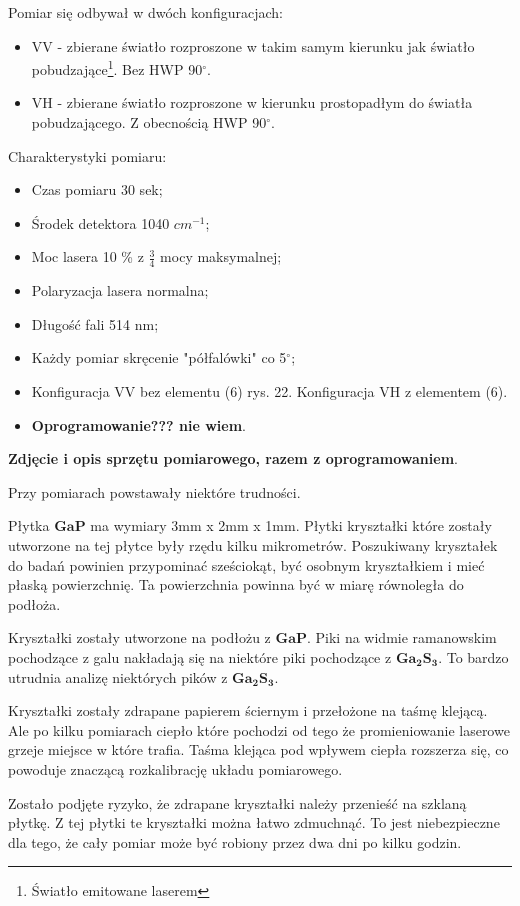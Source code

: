 Pomiar się odbywał w dwóch konfiguracjach:
\begin{itemize}
	\item VV - zbierane światło rozproszone w takim samym kierunku jak światło pobudzające\footnote{Światło emitowane laserem}. Bez HWP 90$^{\circ}$.
	\item VH - zbierane światło rozproszone w kierunku prostopadłym do światła pobudzającego. Z obecnością HWP 90$^{\circ}$.
\end{itemize} 

Charakterystyki pomiaru:
\begin{itemize}
	\item Czas pomiaru 30 sek;
	\item Środek detektora 1040 $cm^{-1}$;
	\item Moc lasera 10 \% z $\frac{3}{4}$ mocy maksymalnej;
	\item Polaryzacja lasera normalna;
	\item Długość fali 514 nm;
	\item Każdy pomiar skręcenie "półfalówki" co 5$^{\circ}$;
	\item Konfiguracja VV bez elementu (6) rys. 22. Konfiguracja VH z elementem (6).
	\item \textbf{Oprogramowanie??? nie wiem}.
\end{itemize}

\textbf{Zdjęcie i opis sprzętu pomiarowego, razem z oprogramowaniem}.

Przy pomiarach powstawały niektóre trudności.

Płytka $\mathbf{GaP}$ ma wymiary 3mm x 2mm x 1mm. Płytki kryształki które zostały utworzone na tej płytce były rzędu kilku mikrometrów. Poszukiwany kryształek do badań powinien przypominać sześciokąt, być osobnym kryształkiem i mieć płaską powierzchnię. Ta powierzchnia powinna być w miarę równoległa do podłoża.

Kryształki zostały utworzone na podłożu z $\mathbf{GaP}$. Piki na widmie ramanowskim pochodzące z galu nakładają się na niektóre piki pochodzące z $\mathbf{Ga_{2}S_{3}}$. To bardzo utrudnia analizę niektórych pików z $\mathbf{Ga_{2}S_{3}}$.

Kryształki zostały zdrapane papierem ściernym i przełożone na taśmę klejącą. Ale po kilku pomiarach ciepło które pochodzi od tego że promieniowanie laserowe grzeje miejsce w które trafia. Taśma klejąca pod wpływem ciepła rozszerza się, co powoduje znaczącą rozkalibrację układu pomiarowego. 

Zostało podjęte ryzyko, że zdrapane kryształki należy przenieść na szklaną płytkę. Z tej płytki te kryształki można łatwo zdmuchnąć. To jest niebezpieczne dla tego, że cały pomiar może być robiony przez dwa dni po kilku godzin.

